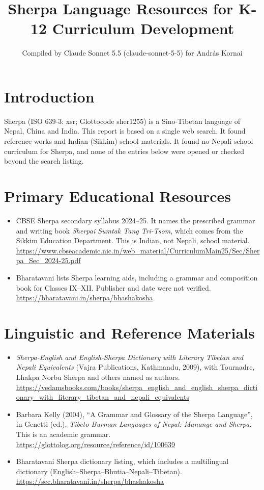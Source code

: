 \documentclass[12pt]{article}
\title{Sherpa Language Resources for K-12 Curriculum Development}
\author{Compiled by Claude Sonnet 5.5 (claude-sonnet-5-5) for Andr\'as Kornai}
\date{}
\begin{document}
\maketitle

\section{Introduction}
Sherpa (ISO 639-3: xsr; Glottocode sher1255) is a Sino-Tibetan language of Nepal, China and India. This report is based on a single web search. It found reference works and Indian (Sikkim) school materials. It found no Nepali school curriculum for Sherpa, and none of the entries below were opened or checked beyond the search listing.

\section{Primary Educational Resources}
\begin{itemize}
\item CBSE Sherpa secondary syllabus 2024--25. It names the prescribed grammar and writing book \emph{Sherpai Sumtak Tang Tri-Tsom}, which comes from the Sikkim Education Department. This is Indian, not Nepali, school material. \url{https://www.cbseacademic.nic.in/web_material/CurriculumMain25/Sec/Sherpa_Sec_2024-25.pdf}
\item Bharatavani lists Sherpa learning aids, including a grammar and composition book for Classes IX--XII. Publisher and date were not verified. \url{https://bharatavani.in/sherpa/bhashakosha}
\end{itemize}

\section{Linguistic and Reference Materials}
\begin{itemize}
\item \emph{Sherpa-English and English-Sherpa Dictionary with Literary Tibetan and Nepali Equivalents} (Vajra Publications, Kathmandu, 2009), with Tournadre, Lhakpa Norbu Sherpa and others named as authors. \url{https://vedamsbooks.com/books/sherpa_english_and_english_sherpa_dictionary_with_literary_tibetan_and_nepali_equivalents}
\item Barbara Kelly (2004), ``A Grammar and Glossary of the Sherpa Language'', in Genetti (ed.), \emph{Tibeto-Burman Languages of Nepal: Manange and Sherpa}. This is an academic grammar. \url{https://glottolog.org/resource/reference/id/100639}
\item Bharatavani Sherpa dictionary listing, which includes a multilingual dictionary (English--Sherpa--Bhutia--Nepali--Tibetan). \url{https://sec.bharatavani.in/sherpa/bhashakosha}
\end{itemize}
\end{document}
